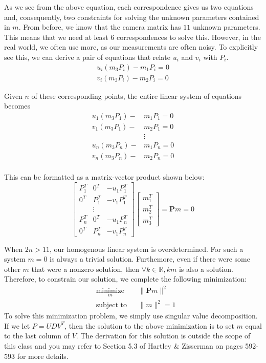 \documentclass[a4paper, 12pt]{article}
\begin{document}
As we see from the above equation, each correspondence gives us two equations and, consequently, two constraints for solving the unknown parameters contained in $m$. From before, we know that the camera matrix has $11$ unknown parameters. This means that we need at least $6$ correspondences to solve this. However, in the real world, we often use more, as our measurements are often noisy. To explicitly see this, we can derive a pair of equations that relate $u_i$ and $v_i$ with $P_i$. 
\begin{align*}
u_i(m_3P_i) - m_1P_i = 0\\
v_i(m_3P_i) - m_2P_i = 0
\end{align*}

Given $n$ of these corresponding points, the entire linear system of equations becomes
\begin{align*}
u_1(m_3P_1) -& m_1P_1 = 0\\
v_1(m_3P_1) -& m_2P_1 = 0\\
&\vdots\\
u_n(m_3P_n) -& m_1P_n = 0\\
v_n(m_3P_n) -& m_2P_n = 0\\
\end{align*}

This can be formatted as a matrix-vector product shown below:
\begin{equation}
\begin{bmatrix} 
P_1^T & 0^T & -u_1P_1^T \\
0^T & P_1^T & -v_1P_1^T \\
& \vdots &\\
P_n^T & 0^T & -u_1P_n^T \\
0^T & P_n^T & -v_1P_n^T 
\end{bmatrix}
\begin{bmatrix}
m_1^T \\ m_2^T \\m_3^T
\end{bmatrix} = \mathbf{P}m = 0
\label{eq:linearsystem}
\end{equation}

When $2n > 11$, our homogenous linear system is overdetermined. For such a system $m=0$ is always a trivial solution. Furthemore, even if there were some other $m$ that were a nonzero solution, then $\forall k\in \mathbb{R},km$ is also a solution. Therefore, to constrain our solution, we complete the following minimization:
\begin{equation}
\begin{aligned}
    & \underset{m}{\text{minimize}}
    & & \|\mathbf{P}m\|^2 \\
    & \text{subject to}
    & & \|m\|^2 = 1
\end{aligned}
\end{equation}
To solve this minimization problem, we simply use singular value decomposition. If we let $P = UDV^T$, then the solution to the above minimization is to set $m$ equal to the last column of $V$. The derivation for this solution is outside the scope of this class and you may refer to Section 5.3 of Hartley \& Zisserman on pages 592-593 for more details.
\end{document}
